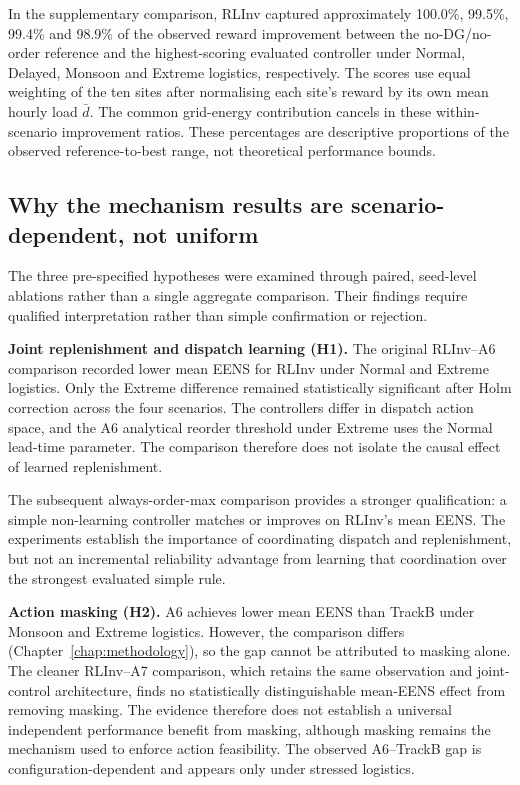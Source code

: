 \begin{revisedblock}
In the supplementary comparison, RLInv captured approximately
100.0\%, 99.5\%, 99.4\% and 98.9\% of the observed reward
improvement between the no-DG/no-order reference and the
highest-scoring evaluated controller under Normal, Delayed,
Monsoon and Extreme logistics, respectively. The scores use
equal weighting of the ten sites after normalising each
site's reward by its own mean hourly load $\bar d$.
The common grid-energy contribution cancels in these
within-scenario improvement ratios. These percentages are
descriptive proportions of the observed reference-to-best
range, not theoretical performance bounds.
\end{revisedblock}


\subsection{Why the mechanism results are scenario-dependent, not uniform}

The three pre-specified hypotheses were examined through
paired, seed-level ablations rather than a single aggregate
comparison. Their findings require qualified interpretation
rather than simple confirmation or rejection.

\begin{revisedblock}
\textbf{Joint replenishment and dispatch learning (H1).}
The original RLInv--A6 comparison recorded lower mean
EENS for RLInv under Normal and Extreme logistics.
Only the Extreme difference remained statistically
significant after Holm correction across the four
scenarios. The controllers differ in dispatch action
space, and the A6 analytical reorder threshold under
Extreme uses the Normal lead-time parameter.
The comparison therefore does not isolate the causal
effect of learned replenishment.

The subsequent always-order-max comparison provides
a stronger qualification: a simple non-learning
controller matches or improves on RLInv's mean EENS.
The experiments establish the importance of coordinating
dispatch and replenishment, but not an incremental
reliability advantage from learning that coordination
over the strongest evaluated simple rule.
\end{revisedblock}

\textbf{Action masking (H2).} 
A6 achieves lower mean EENS than TrackB
under Monsoon and Extreme logistics.
However, the comparison differs
 (Chapter~\ref{chap:methodology}), so the gap cannot be
attributed to masking alone. The cleaner RLInv--A7 comparison, which
retains the same observation and joint-control architecture, finds no
statistically distinguishable mean-EENS effect from removing masking.
The evidence therefore does not establish a universal independent
performance benefit from masking, although masking remains the
mechanism used to enforce action feasibility. The observed A6--TrackB gap is configuration-dependent and appears only under stressed
logistics.

